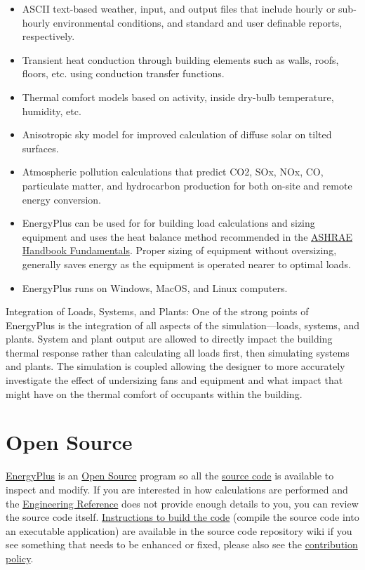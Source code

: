 \begin{itemize}
\item ASCII text-based weather, input, and output files that include hourly
or sub-hourly environmental conditions, and standard and user definable
reports, respectively.
\item Transient heat conduction through building elements such as walls,
roofs, floors, etc. using conduction transfer functions.
\item Thermal comfort models based on activity, inside dry-bulb temperature,
humidity, etc.
\item Anisotropic sky model for improved calculation of diffuse solar on
tilted surfaces.
\item Atmospheric pollution calculations that predict CO2, SOx, NOx, CO,
particulate matter, and hydrocarbon production for both on-site and
remote energy conversion.
\item EnergyPlus can be used for for building load calculations and sizing
equipment and uses the heat balance method recommended in the \href{https://www.ashrae.org/technical-resources/ashrae-handbook}{ASHRAE Handbook Fundamentals}.
Proper sizing of equipment without oversizing, generally saves energy
as the equipment is operated nearer to optimal loads.
\item EnergyPlus runs on Windows, MacOS, and Linux computers.
\end{itemize}
Integration of Loads, Systems, and Plants: One of the strong points
of EnergyPlus is the integration of all aspects of the simulation---loads,
systems, and plants. System and plant output are allowed to directly
impact the building thermal response rather than calculating all loads
first, then simulating systems and plants. The simulation is coupled
allowing the designer to more accurately investigate the effect of
undersizing fans and equipment and what impact that might have on
the thermal comfort of occupants within the building.

\section{Open Source}

\href{https://energyplus.net/}{EnergyPlus} is an \href{https://opensource.org/}{Open Source}
program so all the \href{https://github.com/NREL/EnergyPlus}{source code}
is available to inspect and modify. If you are interested in how calculations
are performed and the \href{https://energyplus.net/documentation}{Engineering Reference}
does not provide enough details to you, you can review the source
code itself. \href{https://github.com/NREL/EnergyPlus/wiki/BuildingEnergyPlus}{Instructions to build the code}
(compile the source code into an executable application) are available
in the source code repository wiki if you see something that needs
to be enhanced or fixed, please also see the \href{https://energyplus.net/contributing}{contribution policy}.

